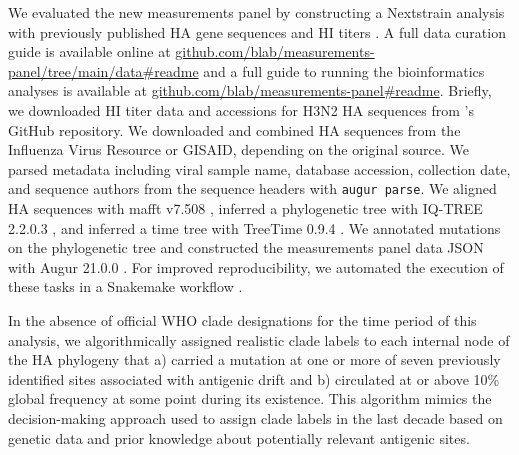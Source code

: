 \documentclass[utf8]{FrontiersinHarvard} %
\begin{document}
We evaluated the new measurements panel by constructing a Nextstrain analysis \citep{Hadfield2018} with previously published HA gene sequences and HI titers \citep{Bedford:2014bf}.
A full data curation guide is available online at \href{https://github.com/blab/measurements-panel/tree/main/data#readme}{github.com/blab/measurements-panel/tree/main/data\#readme} and a full guide to running the bioinformatics analyses is available at \href{https://github.com/blab/measurements-panel#readme}{github.com/blab/measurements-panel\#readme}.
Briefly, we downloaded HI titer data and accessions for H3N2 HA sequences from \cite{Bedford:2014bf}'s GitHub repository.
We downloaded and combined HA sequences from the Influenza Virus Resource or GISAID, depending on the original source.
We parsed metadata including viral sample name, database accession, collection date, and sequence authors from the sequence headers with \texttt{augur parse}.
We aligned HA sequences with mafft v7.508 \citep{Katoh2013}, inferred a phylogenetic tree with IQ-TREE 2.2.0.3 \citep{Minh2020}, and inferred a time tree with TreeTime 0.9.4 \citep{Sagulenko2018}.
We annotated mutations on the phylogenetic tree and constructed the measurements panel data JSON with Augur 21.0.0 \citep{Huddleston2021}.
For improved reproducibility, we automated the execution of these tasks in a Snakemake workflow \citep{Molder2021}.

In the absence of official WHO clade designations for the time period of this analysis, we algorithmically assigned realistic clade labels to each internal node of the HA phylogeny that a) carried a mutation at one or more of seven previously identified sites associated with antigenic drift \citep{Koel:2013jz} and b) circulated at or above 10\% global frequency at some point during its existence.
This algorithm mimics the decision-making approach used to assign clade labels in the last decade based on genetic data and prior knowledge about potentially relevant antigenic sites.
\end{document}
